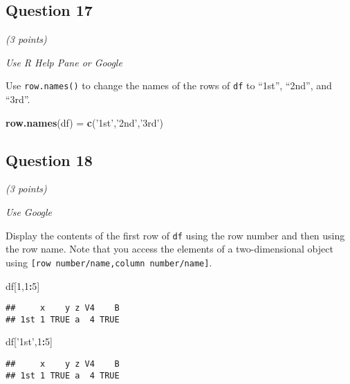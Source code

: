 \documentclass[
]{article}
\newenvironment{Shaded}{\begin{snugshade}}{\end{snugshade}}
\newcommand{\DecValTok}[1]{\textcolor[rgb]{0.00,0.00,0.81}{#1}}
\newcommand{\KeywordTok}[1]{\textcolor[rgb]{0.13,0.29,0.53}{\textbf{#1}}}
\newcommand{\NormalTok}[1]{#1}
\newcommand{\OperatorTok}[1]{\textcolor[rgb]{0.81,0.36,0.00}{\textbf{#1}}}
\newcommand{\StringTok}[1]{\textcolor[rgb]{0.31,0.60,0.02}{#1}}
\begin{document}
\hypertarget{question-17}{%
\subsection{Question 17}\label{question-17}}

\emph{(3 points)}

\emph{Use R Help Pane or Google}

Use \texttt{row.names()} to change the names of the rows of \texttt{df}
to ``1st'', ``2nd'', and ``3rd''.

\begin{Shaded}
\begin{Highlighting}[]
\KeywordTok{row.names}\NormalTok{(df) =}\StringTok{ }\KeywordTok{c}\NormalTok{(}\StringTok{'1st'}\NormalTok{,}\StringTok{'2nd'}\NormalTok{,}\StringTok{'3rd'}\NormalTok{)}
\end{Highlighting}
\end{Shaded}

\hypertarget{question-18}{%
\subsection{Question 18}\label{question-18}}

\emph{(3 points)}

\emph{Use Google}

Display the contents of the first row of \texttt{df} using the row
number and then using the row name. Note that you access the elements of
a two-dimensional object using
\texttt{{[}row\ number/name,column\ number/name{]}}.

\begin{Shaded}
\begin{Highlighting}[]
\NormalTok{df[}\DecValTok{1}\NormalTok{,}\DecValTok{1}\OperatorTok{:}\DecValTok{5}\NormalTok{]}
\end{Highlighting}
\end{Shaded}

\begin{verbatim}
##     x    y z V4    B
## 1st 1 TRUE a  4 TRUE
\end{verbatim}

\begin{Shaded}
\begin{Highlighting}[]
\NormalTok{df[}\StringTok{'1st'}\NormalTok{,}\DecValTok{1}\OperatorTok{:}\DecValTok{5}\NormalTok{]}
\end{Highlighting}
\end{Shaded}

\begin{verbatim}
##     x    y z V4    B
## 1st 1 TRUE a  4 TRUE
\end{verbatim}
\end{document}
